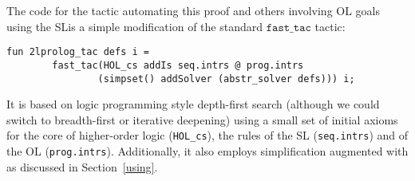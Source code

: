 \documentclass[final]{svjour3}
\begin{document}
The code for the
 tactic
automating this proof and others involving OL goals using the
SL\@ is a simple modification of the standard $\mathtt{fast\_tac}$ tactic:
\begin{verbatim}
fun 2lprolog_tac defs i =
        fast_tac(HOL_cs addIs seq.intrs @ prog.intrs
                (simpset() addSolver (abstr_solver defs))) i;
\end{verbatim}
It is based on logic programming style depth-first search
(although we could switch to breadth-first or iterative deepening)
using a small set of initial axioms for the core of higher-order logic
(\verb+HOL_cs+), the rules of the SL (\verb+seq.intrs+) and of the OL
(\verb+prog.intrs+).  Additionally, it also employs simplification
augmented with  as discussed in Section~\ref{using}.
\end{document}
